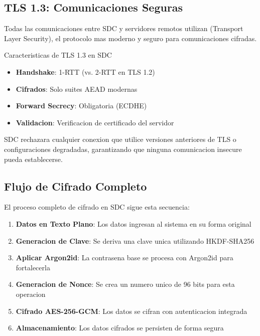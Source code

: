 \subsection{TLS 1.3: Comunicaciones Seguras}

Todas las comunicaciones entre SDC y servidores remotos utilizan  (Transport Layer Security), el protocolo mas moderno y seguro para comunicaciones cifradas.


\begin{caja}{Caracteristicas de TLS 1.3 en SDC}
\begin{itemize}
\item \textbf{Handshake}: 1-RTT (vs. 2-RTT en TLS 1.2)
\item \textbf{Cifrados}: Solo suites AEAD modernas
\item \textbf{Forward Secrecy}: Obligatoria (ECDHE)
\item \textbf{Validacion}: Verificacion de certificado del servidor
\end{itemize}
\end{caja}

SDC rechazara cualquier conexion que utilice versiones anteriores de TLS o configuraciones degradadas, garantizando que ninguna comunicacion insecure pueda establecerse.

\subsection{Flujo de Cifrado Completo}

El proceso completo de cifrado en SDC sigue esta secuencia:

\begin{enumerate}
\item \textbf{Datos en Texto Plano}: Los datos ingresan al sistema en su forma original
\item \textbf{Generacion de Clave}: Se deriva una clave unica utilizando HKDF-SHA256
\item \textbf{Aplicar Argon2id}: La contrasena base se procesa con Argon2id para fortalecerla
\item \textbf{Generacion de Nonce}: Se crea un numero unico de 96 bits para esta operacion
\item \textbf{Cifrado AES-256-GCM}: Los datos se cifran con autenticacion integrada
\item \textbf{Almacenamiento}: Los datos cifrados se persisten de forma segura
\end{enumerate}

